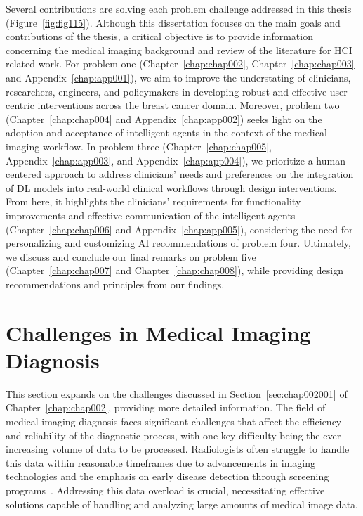 Several contributions are solving each problem challenge addressed in this thesis (Figure~\ref{fig:fig115}).
Although this dissertation focuses on the main goals and contributions of the thesis, a critical objective is to provide information concerning the medical imaging background and review of the literature for \ac{HCI} related work.
For problem one (Chapter~\ref{chap:chap002}, Chapter~\ref{chap:chap003} and Appendix~\ref{chap:app001}), we aim to improve the understating of clinicians, researchers, engineers, and policymakers in developing robust and effective user-centric interventions across the breast cancer domain.
Moreover, problem two (Chapter~\ref{chap:chap004} and Appendix~\ref{chap:app002}) seeks light on the adoption and acceptance of intelligent agents in the context of the medical imaging workflow.
In problem three (Chapter~\ref{chap:chap005}, Appendix~\ref{chap:app003}, and Appendix~\ref{chap:app004}), we prioritize a human-centered approach to address clinicians' needs and preferences on the integration of \ac{DL} models into real-world clinical workflows through design interventions.
From here, it highlights the clinicians' requirements for functionality improvements and effective communication of the intelligent agents (Chapter~\ref{chap:chap006} and Appendix~\ref{chap:app005}), considering the need for personalizing and customizing \ac{AI} recommendations of problem four.
Ultimately, we discuss and conclude our final remarks on problem five (Chapter~\ref{chap:chap007} and Chapter~\ref{chap:chap008}), while providing design recommendations and principles from our findings.






\section{Challenges in Medical Imaging Diagnosis}
\label{sec:app001001}

This section expands on the challenges discussed in Section~\ref{sec:chap002001} of Chapter~\ref{chap:chap002}, providing more detailed information.
The field of medical imaging diagnosis faces significant challenges that affect the efficiency and reliability of the diagnostic process, with one key difficulty being the ever-increasing volume of data to be processed.
Radiologists often struggle to handle this data within reasonable timeframes due to advancements in imaging technologies and the emphasis on early disease detection through screening programs~\cite{HANNA20181709, McKinney2020}.
Addressing this data overload is crucial, necessitating effective solutions capable of handling and analyzing large amounts of medical image data.

